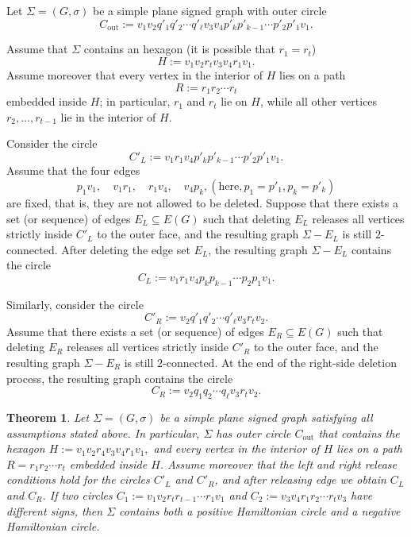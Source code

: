 \documentclass[12pt]{amsart}
\theoremstyle{theorem}%
\newtheorem{theorem}{Theorem}[section]
\theoremstyle{definition}%
\begin{document}
Let $\Sigma=(G,\sigma)$ be a simple plane signed graph with outer circle
\[
C_{\mathrm{out}}
:=v_1v_2q'_1q'_2\cdots q'_\ell v_3v_4p'_kp'_{k-1}\cdots p'_2p'_1v_1.
\]

Assume that $\Sigma$ contains an  hexagon (it is possible that $r_1=r_t$)
\[
H:=v_1v_2r_tv_3v_4r_1v_1.
\]
Assume moreover that every vertex in the interior of $H$ lies on a path
\[
R:=r_1r_2\cdots r_t
\]
embedded inside $H$; in particular, $r_1$ and $r_t$ lie on $H$, while all other vertices
$r_2,\dots,r_{t-1}$ lie  in the interior of $H$.

Consider the circle
\[
C'_L:=v_1r_1v_4p'_kp'_{k-1}\cdots p'_2p'_1v_1.
\]
Assume that the four  edges
\[
p_1v_1,\quad v_1r_1,\quad r_1v_4,\quad v_4p_k, (\text{here}, p_1=p'_1,p_k=p'_k)
\]
are fixed, that is, they are not allowed to be deleted.
Suppose that there exists a set (or sequence) of edges
$E_L\subseteq E(G)$ such that deleting $E_L$ releases all vertices
strictly inside $C'_L$ to the outer face, and the resulting graph
$\Sigma-E_L$ is still $2$-connected. After deleting the edge set $E_L$, the resulting graph $\Sigma-E_L$ contains the circle
\[
C_L:=v_1r_1v_4p_kp_{k-1}\cdots p_2p_1v_1.
\]


Similarly, consider the circle
\[
C'_R:=v_2q'_1q'_2\cdots q'_\ell v_3r_tv_2.
\]
Assume that there exists a set (or sequence) of edges
$E_R\subseteq E(G)$ such that deleting $E_R$ releases all vertices
strictly inside $C'_R$ to the outer face, and the resulting graph
$\Sigma-E_R$ is still $2$-connected. At the end of the right-side deletion process, the resulting graph contains the circle
\[
C_R:=v_2q_1q_2\cdots q_\ell v_3r_tv_2.
\]



\begin{theorem}\label{thm:two-opposite-ribbon-cycles-give-both-signs}
Let $\Sigma=(G,\sigma)$  be a simple plane signed graph satisfying all assumptions stated above.
In particular, $\Sigma$ has outer circle
$C_{\mathrm{out}}$ that contains the  hexagon
$H:=v_1v_2r_4v_3v_4r_1v_1,$
and every vertex in the interior of $H$ lies on a path $R=r_1r_2\cdots r_t$ embedded inside $H$.
Assume moreover that the left and right release conditions hold for the circles $C'_L$ and $C'_R$, and after releasing edge we obtain $C_L$ and $C_R$. If two circles $C_1:=v_1v_2r_t r_{t-1}\cdots r_1v_1$ and $C_2:=v_3v_4r_1 r_2\cdots r_tv_3$ have different signs, then $\Sigma$ contains both a positive Hamiltonian circle and a negative
Hamiltonian circle.
\end{theorem}
\end{document}
